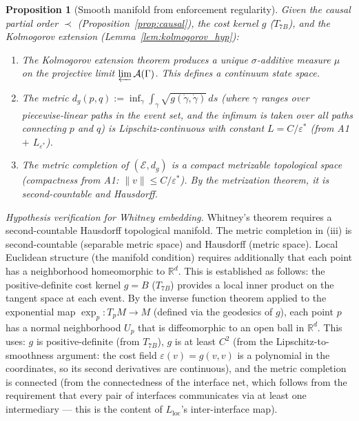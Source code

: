 \documentclass[11pt,a4paper]{article}
\newtheorem{proposition}[theorem]{Proposition}
\theoremstyle{definition}
\begin{document}
\begin{proposition}[Smooth manifold from enforcement regularity]
\label{prop:continuum}
Given the causal partial order $\prec$ (Proposition~\ref{prop:causal}),
the cost kernel $g$ ($T_{7B}$), and the Kolmogorov extension
(Lemma~\ref{lem:kolmogorov_hyp}):
\begin{enumerate}[label=(\roman*),nosep]
  \item The Kolmogorov extension theorem produces a unique
  $\sigma$-additive measure $\mu$ on the projective limit
  $\varprojlim \mathcal{A}(\Gamma)$.  This defines a continuum
  state space.
  \item The metric $d_g(p, q) := \inf_\gamma \int_\gamma
  \sqrt{g(\dot\gamma, \dot\gamma)}\,ds$ (where $\gamma$ ranges over
  piecewise-linear paths in the event set, and the infimum is taken
  over all paths connecting $p$ and $q$) is Lipschitz-continuous with
  constant $L = C / \varepsilon^*$ (from A1 $+$ $L_{\varepsilon^*}$).
  \item The metric completion of $(\mathcal{E}, d_g)$ is a compact
  metrizable topological space (compactness from A1:
  $\|v\| \le C / \varepsilon^*$).  By the metrization theorem, it is
  second-countable and Hausdorff.
\end{enumerate}
\end{proposition}

\noindent\textit{Hypothesis verification for Whitney embedding.}\quad
Whitney's theorem requires a second-countable Hausdorff topological
manifold.  The metric completion in (iii) is second-countable
(separable metric space) and Hausdorff (metric space).  Local
Euclidean structure (the manifold condition) requires additionally
that each point has a neighborhood homeomorphic to $\mathbb{R}^d$.
This is established as follows: the positive-definite cost kernel
$g = B$ ($T_{7B}$) provides a local inner product on the tangent
space at each event.  By the inverse function theorem applied to the
exponential map $\exp_p: T_pM \to M$ (defined via the geodesics of
$g$), each point $p$ has a normal neighborhood $U_p$ that is
diffeomorphic to an open ball in $\mathbb{R}^d$.  This uses: $g$ is
positive-definite (from $T_{7B}$), $g$ is at least $C^2$ (from the
Lipschitz-to-smoothness argument: the cost field
$\varepsilon(v) = g(v,v)$ is a polynomial in the coordinates, so its
second derivatives are continuous), and the metric completion is
connected (from the connectedness of the interface net, which follows
from the requirement that every pair of interfaces communicates via
at least one intermediary --- this is the content of
$L_{\mathrm{loc}}$'s inter-interface map).
\end{document}
